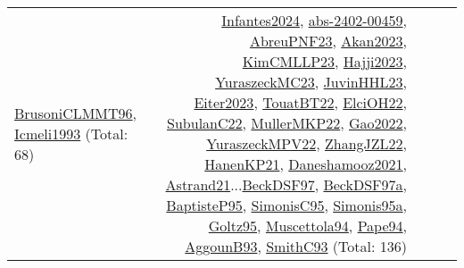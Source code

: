 {\begin{longtable}{p{3cm}r>{\raggedright\arraybackslash}p{6cm}>{\raggedright\arraybackslash}p{6cm}>{\raggedright\arraybackslash}p{8cm}}
\hyperref[detail:BrusoniCLMMT96]{BrusoniCLMMT96}, \hyperref[detail:Icmeli1993]{Icmeli1993} (Total: 68) & \hyperref[detail:Infantes2024]{Infantes2024}, \hyperref[detail:abs-2402-00459]{abs-2402-00459}, \hyperref[detail:AbreuPNF23]{AbreuPNF23}, \hyperref[detail:Akan2023]{Akan2023}, \hyperref[detail:KimCMLLP23]{KimCMLLP23}, \hyperref[detail:Hajji2023]{Hajji2023}, \hyperref[detail:YuraszeckMC23]{YuraszeckMC23}, \hyperref[detail:JuvinHHL23]{JuvinHHL23}, \hyperref[detail:Eiter2023]{Eiter2023}, \hyperref[detail:TouatBT22]{TouatBT22}, \hyperref[detail:ElciOH22]{ElciOH22}, \hyperref[detail:SubulanC22]{SubulanC22}, \hyperref[detail:MullerMKP22]{MullerMKP22}, \hyperref[detail:Gao2022]{Gao2022}, \hyperref[detail:YuraszeckMPV22]{YuraszeckMPV22}, \hyperref[detail:ZhangJZL22]{ZhangJZL22}, \hyperref[detail:HanenKP21]{HanenKP21}, \hyperref[detail:Daneshamooz2021]{Daneshamooz2021}, \hyperref[detail:Astrand21]{Astrand21}...\hyperref[detail:BeckDSF97]{BeckDSF97}, \hyperref[detail:BeckDSF97a]{BeckDSF97a}, \hyperref[detail:BaptisteP95]{BaptisteP95}, \hyperref[detail:SimonisC95]{SimonisC95}, \hyperref[detail:Simonis95a]{Simonis95a}, \hyperref[detail:Goltz95]{Goltz95}, \hyperref[detail:Muscettola94]{Muscettola94}, \hyperref[detail:Pape94]{Pape94}, \hyperref[detail:AggounB93]{AggounB93}, \hyperref[detail:SmithC93]{SmithC93} (Total: 136)\\

\end{longtable}}
